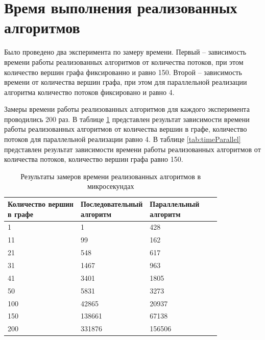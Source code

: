 \section{Время выполнения реализованных алгоритмов}

Было проведено два эксперимента по замеру времени. Первый -- зависимость времени работы реализованных алгоритмов от количества потоков, при этом количество вершин графа фиксированно и равно 150. Второй -- зависимость времени  от количества вершин графа, при этом для параллельной реализации алгоритма количество потоков фиксировано и равно 4.

Замеры времени работы реализованных алгоритмов для каждого эксперимента проводились 200 раз. 
В таблице \ref{tab:time} представлен результат зависимости времени работы реализованных алгоритмов от количества вершин в графе, количество потоков для параллельной реализации равно 4. В таблице \ref{tab:timeParallel} представлен результат зависимости времени работы реализованных алгоритмов от количества потоков, количество вершин графа равно 150.
\clearpage
\begin{table}[H]
	\begin{center}
		\begin{flushleft}
			\caption{\label{tab:time}Результаты замеров времени реализованных алгоритмов в микросекундах}
		\end{flushleft}
		\begin{tabular}{|l|l|l|l|l|}
			\hline \specialcell{Количество вершин\\в графе} & \specialcell{Последовательный\\алгоритм} &
			\specialcell{Параллельный\\алгоритм}  \\\hline
			1   & 1      & 428   \\ \hline
			11  & 99     & 162   \\ \hline
			21  & 548    & 617   \\ \hline
			31  & 1467   & 963   \\ \hline
			41  & 3401   & 1805   \\ \hline
			50  & 5831   & 3273   \\ \hline
			100 & 42865  & 20937   \\ \hline
			150 & 138661 & 67138   \\ \hline
			200 & 331876 & 156506     \\ \hline
		\end{tabular}
	\end{center}
\end{table}
